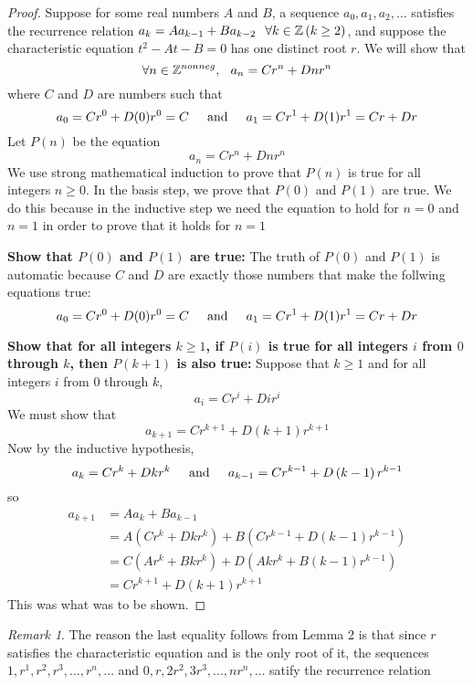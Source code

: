 \documentclass{article}
\theoremstyle{definition}
\theoremstyle{remark}
\newtheorem*{remark}{Remark}
\theoremstyle{plain}
\begin{document}
\begin{proof}
  Suppose for some real numbers $A$ and $B$, a sequence $a_0, a_1, a_2, \ldots$ satisfies the recurrence relation $a_k = Aa_{k-1} + Ba_{k-2} \hspace{0.1in} \forall k \in \mathbb{Z}\left(k\geq 2\right)$, and suppose the characteristic equation $t^2-At-B=0$ has one distinct root $r$. We will show that 
  \[
    \forall n \in \mathbb{Z}^{nonneg}, \hspace{0.1in} a_n = Cr^n + Dnr^n
  \]
  where $C$ and $D$ are numbers such that \\
  \[
    a_0 = Cr^{0} + D(0)r^{0} = C \hspace{0.2in} \text{and} \hspace{0.2in} a_1 = Cr^{1} + D(1)r^{1} = Cr + Dr
  \]
  Let $P(n)$ be the equation 
  \[
    a_n = Cr^{n} + Dnr^{n} 
  \]
  We use strong mathematical induction to prove that $P(n)$ is true for all integers $n \geq 0$. In the basis step, we prove that $P(0)$ and $P(1)$ are true. We do this because in the inductive step we need the equation to hold for $n=0$ and $n=1$ in order to prove that it holds for $n=1$

  \textbf{Show that $P(0)$ and $P(1)$ are true:} The truth of $P(0)$ and $P(1)$ is automatic because $C$ and $D$ are exactly those numbers that make the follwing equations true:
  \[
    a_0 = Cr^{0} + D(0)r^{0} = C \hspace{0.2in} \text{and} \hspace{0.2in} a_1 = Cr^{1} + D(1)r^{1} = Cr + Dr
  \]

  \textbf{Show that for all integers $k\geq 1$, if $P(i)$ is true for all integers $i$ from $0$ through $k$, then $P(k+1)$ is also true:} Suppose that $k\geq 1$ and for all integers $i$ from $0$ through $k$, 
  \[ a_i = Cr^{i} + Dir^{i}\] 
  We must show that 
  \[ a_{k+1} = Cr^{k+1} + D\left(k+1\right)r^{k+1}\]
  Now by the inductive hypothesis, 
  \[ a_k = Cr^{k} + Dkr^{k} \hspace{0.2in} \text{and} \hspace{0.2in} a_{k-1} = Cr^{k-1} + D\left(k-1\right)r^{k-1} \]
  so 
  \begin{align*}
    a_{k+1} &= Aa_{k} + Ba_{k-1} \tag{by definition of $a_0, a_1, a_2, \ldots$} \\ 
    &= A\left(Cr^{k} + Dkr^{k}\right) + B\left(Cr^{k-1} + D\left(k-1\right)r^{k-1}\right) \tag{by inductive hypothesis}\\ 
    &= C\left(Ar^{k} + Bkr^{k}\right) + D\left(Akr^{k} + B\left(k-1\right)r^{k-1}\right) \tag{by combining like terms} \\ 
    &= Cr^{k+1} + D\left(k+1\right)r^{k+1} \tag{by Lemma 1}
  \end{align*}
  This was what was to be shown. 

\end{proof}
\begin{remark}
  The reason the last equality follows from Lemma 2 is that since $r$ satisfies the characteristic equation and is the only root of it, the sequences $1, r^{1}, r^{2}, r^{3}, \ldots, r^{n}, \ldots$ and $0, r, 2r^{2}, 3r^{3}, \ldots, nr^{n}, \ldots$ satify the recurrence relation
\end{remark}
\end{document}
